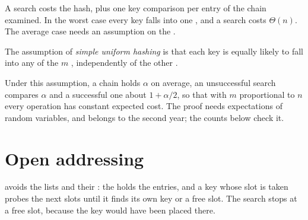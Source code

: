 \label{out:b1:hash-tables:chain-demo}

A search costs the hash, plus one key comparison per entry of the chain examined. In the worst case every key falls into
one , and a search costs $\Theta(n)$. The average case needs an assumption on the .

\begin{definition}\label{def:b1:hash-tables:uniform}
The assumption of \emph{simple uniform hashing} is that each key is equally
likely to fall into any of the $m$ , independently of the other .
\end{definition}

Under this assumption, a chain holds $\alpha$  on average, an unsuccessful search compares $\alpha$  and a
successful one about $1 + \alpha/2$, so that with $m$ proportional to $n$ every operation has constant expected cost. The
proof needs expectations of random variables, and belongs to the second year; the counts below check it.


\section{Open addressing}\label{sec:b1:hash-tables:open}

 avoids the lists and their : the  holds the entries, and a key whose slot is taken probes
the next slots until it finds its own key or a free slot. The search stops at a free slot, because the key would have
been placed there.

\label{lst:b1:hash-tables:probe}

